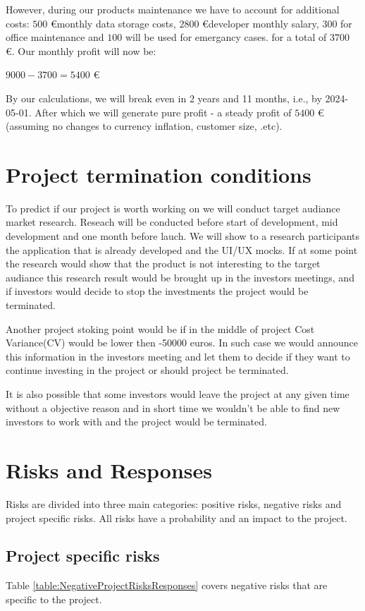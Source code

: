 \documentclass{VUMIFPSkursinis}
\begin{document}
However, during our products maintenance we have to account for additional costs: $500$ \euro monthly data storage costs, $2800$ \euro developer monthly salary, $300$ for office maintenance and $100$ will be used for emergancy cases. for a total of $3700$ \euro. Our monthly profit will now be:
\begin{center}
	$9000 - 3700 = 5400$ \euro
\end{center}
  By our calculations, we will break even in 2 years and 11 months, i.e., by 2024-05-01. After which we will generate pure profit - a steady profit of $5400$ \euro (assuming no changes to currency inflation, customer size, .etc).

\section{Project termination conditions}
	To predict if our project is worth working on we will conduct target audiance market research.
	Reseach will be conducted before start of development, mid development and one month before lauch.
	We will show to a research participants the application that is already developed and the UI/UX mocks.
	If at some point the research would show that the product is not interesting to the target audiance this research result would be brought up in the investors meetings, and if investors would decide to stop the investments the project would be terminated.
	

	Another project stoking point would be if in the middle of project Cost Variance(CV) would be lower then -50000 euros.
	In such case we would announce this information in the investors meeting and let them to decide if they want to continue investing in the project or should project be terminated.


	It is also possible that some investors would leave the project at any given time without a objective reason and in short time we wouldn't be able to find new investors to work with and the project would be terminated.


\section{Risks and Responses}
Risks are divided into three main categories: positive risks, negative risks and project specific risks. All risks have a probability and an impact to the project.

\subsection{Project specific risks}
Table \ref{table:NegativeProjectRisksResponses} covers negative risks that are specific to the project.
\end{document}
